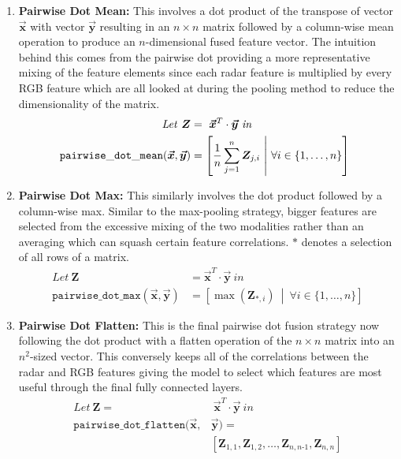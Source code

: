 \documentclass{mpaper}
\begin{document}
\begin{enumerate}
    \item \textbf{Pairwise Dot Mean:} This involves a dot product of the transpose of vector $\bm{\vec{x}}$ with vector $\bm{\vec{y}}$ resulting in an $n \times n$ matrix followed by a column-wise mean operation to produce an $n$-dimensional fused feature vector. The intuition behind this comes from the pairwise dot providing a more representative mixing of the feature elements since each radar feature is multiplied by every RGB feature which are all looked at during the pooling method to reduce the dimensionality of the matrix.
    \begin{align*}
        \mathit{Let} \ \bm{Z} & = \ \bm{\vec{x}}^T \cdot \bm{\vec{y}} \ \mathit{in} \\
        \hspace{-0.2cm}\mathtt{pairwise\_dot\_mean}(\bm{\vec{x}}, \bm{\vec{y}}) &= \left[ \frac{1}{n} \sum_{j=1}^n \bm{Z}_{j,i} \ \middle| \ \forall i \in \{1, \ldots, n\}\right]
    \end{align*}
    
    \item \textbf{Pairwise Dot Max:} This similarly involves the dot product followed by a column-wise max. Similar to the max-pooling strategy, bigger features are selected from the excessive mixing of the two modalities rather than an averaging which can squash certain feature correlations. $*$ denotes a selection of all rows of a matrix.
    \begin{align*}
        \mathit{Let} \ \bm{Z} & = \bm{\vec{x}}^T \cdot \bm{\vec{y}} \ \mathit{in} \\
        \mathtt{pairwise\_dot\_max}(\bm{\vec{x}}, \bm{\vec{y}}) &= \left[ \max(\bm{Z}_{*,i}) \ \middle| \ \forall i \in \{1, \ldots, n\} \right]
    \end{align*}
    
    \item \textbf{Pairwise Dot Flatten:} This is the final pairwise dot fusion strategy now following the dot product with a flatten operation of the $n \times n$ matrix into an $n^2$-sized vector. This conversely keeps all of the correlations between the radar and RGB features giving the model to select which features are most useful through the final fully connected layers.
    \begin{align*}
        \mathit{Let} \ \bm{Z} = & \ \bm{\vec{x}}^T \cdot \bm{\vec{y}} \ \mathit{in} \\
        \mathtt{pairwise\_dot\_flatten}(\bm{\vec{x}}, &\bm{\vec{y}}) =\\ &\left[ \bm{Z}_{1,1}, \bm{Z}_{1,2}, \ldots, \bm{Z}_{n,n\text{-}1}, \bm{Z}_{n,n} \right]
    \end{align*}
    

\end{enumerate}
\end{document}
